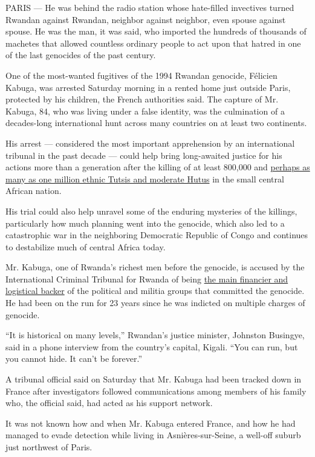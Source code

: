 PARIS --- He was behind the radio station whose hate-filled invectives
turned Rwandan against Rwandan, neighbor against neighbor, even spouse
against spouse. He was the man, it was said, who imported the hundreds
of thousands of machetes that allowed countless ordinary people to act
upon that hatred in one of the last genocides of the past century.

One of the most-wanted fugitives of the 1994 Rwandan genocide, Félicien
Kabuga, was arrested Saturday morning in a rented home just outside
Paris, protected by his children, the French authorities said. The
capture of Mr. Kabuga, 84, who was living under a false identity, was
the culmination of a decades-long international hunt across many
countries on at least two continents.

His arrest --- considered the most important apprehension by an
international tribunal in the past decade --- could help bring
long-awaited justice for his actions more than a generation after the
killing of at least 800,000 and
\href{https://www.nytimes3xbfgragh.onion/2019/04/06/world/africa/rwanda-genocide-25-years.html}{perhaps
as many as one million ethnic Tutsis and moderate Hutus} in the small
central African nation.

His trial could also help unravel some of the enduring mysteries of the
killings, particularly how much planning went into the genocide, which
also led to a catastrophic war in the neighboring Democratic Republic of
Congo and continues to destabilize much of central Africa today.

Mr. Kabuga, one of Rwanda's richest men before the genocide, is accused
by the International Criminal Tribunal for Rwanda of being
\href{https://2009-2017.state.gov/j/gcj/wcrp/206}{the main financier and
logistical backer} of the political and militia groups that committed
the genocide. He had been on the run for 23 years since he was indicted
on multiple charges of genocide.

``It is historical on many levels,'' Rwandan's justice minister,
Johnston Busingye, said in a phone interview from the country's capital,
Kigali. ``You can run, but you cannot hide. It can't be forever.''

A tribunal official said on Saturday that Mr. Kabuga had been tracked
down in France after investigators followed communications among members
of his family who, the official said, had acted as his support network.

It was not known how and when Mr. Kabuga entered France, and how he had
managed to evade detection while living in Asnières-sur-Seine, a
well-off suburb just northwest of Paris.

